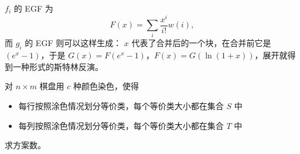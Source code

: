 \begin{exercise}[斯特林反演与生成函数]
    $f_i$ 的 EGF 为
    $$
    F(x)=\sum_i \frac{x^i}{i!}w(i),
    $$
    而 $g_i$ 的 EGF 则可以这样生成： $x$ 代表了合并后的一个块，在合并前它是 $(e^x-1)$，于是 $G(x)=F(e^x-1)$，$F(x)=G(\ln(1+x))$，展开就得到一种形式的斯特林反演。
\end{exercise}
\begin{exercise}
    
\end{exercise}
\begin{exercise}
    
\end{exercise}
\begin{example}
    对 $n\times m$ 棋盘用 $c$ 种颜色染色，使得
    \begin{itemize}
        \item 每行按照涂色情况划分等价类，每个等价类大小都在集合 $S$ 中
        \item 每列按照涂色情况划分等价类，每个等价类大小都在集合 $T$ 中
    \end{itemize}
    求方案数。
\end{example}
